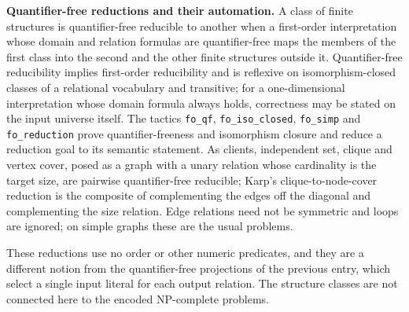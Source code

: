 \begin{result}
\textbf{Quantifier-free reductions and their automation.}
A class of finite structures is quantifier-free reducible to another when a
first-order interpretation whose domain and relation formulas are quantifier-free
maps the members of the first class into the second and the other finite
structures outside it. Quantifier-free reducibility implies first-order
reducibility and is reflexive on isomorphism-closed classes of a relational
vocabulary and transitive; for a one-dimensional interpretation whose domain
formula always holds, correctness may be stated on the input universe itself.
The tactics \texttt{fo\_qf}, \texttt{fo\_iso\_closed}, \texttt{fo\_simp} and
\texttt{fo\_reduction} prove quantifier-freeness and isomorphism closure and
reduce a reduction goal to its semantic statement. As clients, independent set,
clique and vertex cover, posed as a graph with a unary relation whose cardinality
is the target size, are pairwise quantifier-free reducible; Karp's
clique-to-node-cover reduction is the composite of complementing the edges off
the diagonal and complementing the size relation. Edge relations need not be
symmetric and loops are ignored; on simple graphs these are the usual
problems.\citep{Karp1972,GareyJohnson1979,Immerman1999}

These reductions use no order or other numeric predicates, and they are a
different notion from the quantifier-free projections of the previous entry,
which select a single input literal for each output relation. The structure
classes are not connected here to the encoded NP-complete problems.
\end{result}

